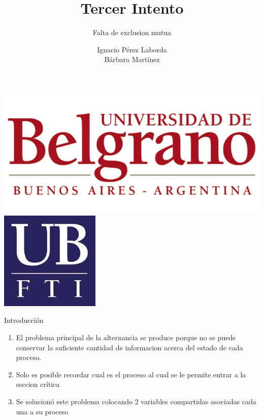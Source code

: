 \documentclass{beamer}
\title[Tecnologia]
{Tercer Intento}
\subtitle{Falta de exclusion mutua}
\author[Grupo 1] 
{Ignacio P\'erez Laborda\\B\'arbara Mart\'inez}
\institute[UB--FTI] 
{
  Facultad de Tecnolog\'ia Inform\'atica\\
  Universidad de Belgrano
}
\date[\today]
\begin{document}

\begin{frame}

\includegraphics[height=0.2\textheight]{ub2.jpg} \hspace*{6cm}
\includegraphics[height=0.19\textheight]{FTI.jpg}  
\\[-0.1cm]
\titlepage


\end{frame}

\begin{frame}{Introducción}

\begin{enumerate}[$*$]
\item El problema principal de la alternancia se produce porque no se puede conservar la suficiente cantidad de informacion acerca del estado de cada proceso.
\item   Solo es posible recordar cual es el proceso al cual se le permite entrar a la seccion crítica
\item  Se solucionó este problema colocando 2 variables compartidas asociadas cada una a su proceso 
\end{enumerate}

\end{frame}
\end{document}

